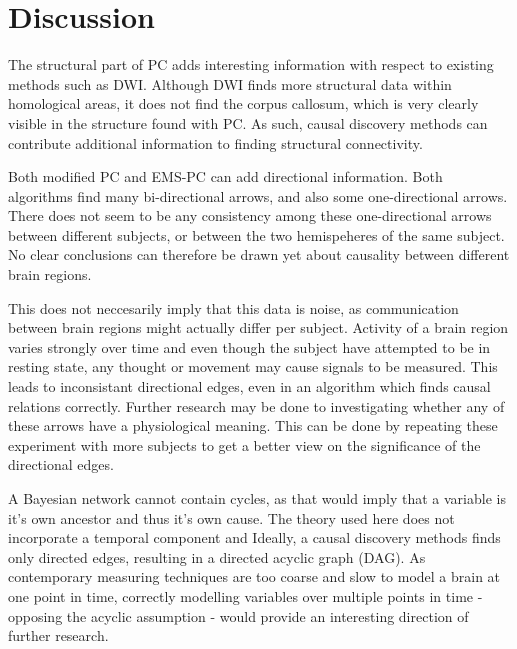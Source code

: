 \documentclass[a4paper, 10pt, english, onecolumn]{article}
\begin{document}
\section{Discussion}

The structural part of PC adds interesting information with respect to existing methods such as DWI.
Although DWI finds more structural data within homological areas, it does not find the corpus callosum, which is very clearly visible in the structure found with PC.
As such, causal discovery methods can contribute additional information to finding structural connectivity.

Both modified PC and EMS-PC can add directional information.
Both algorithms find many bi-directional arrows, and also some one-directional arrows.
There does not seem to be any consistency among these one-directional arrows  between different subjects, or between the two hemispeheres of the same subject.
No clear conclusions can therefore be drawn yet about causality between different brain regions.

This does not neccesarily imply that this data is noise, as communication between brain regions might actually differ per subject.
Activity of a brain region varies strongly over time and even though the subject have attempted to be in resting state, any thought or movement may cause signals to be measured.
This leads to inconsistant directional edges, even in an algorithm which finds causal relations correctly.
Further research may be done to investigating whether any of these arrows have a physiological meaning.
This can be done by repeating these experiment with more subjects to get a better view on the significance of the directional edges.

A Bayesian network cannot contain cycles, as that would imply that a variable is it's own ancestor and thus it's own cause.
The theory used here does not incorporate a temporal component and 
Ideally, a causal discovery methods finds only directed edges, resulting in a directed acyclic graph (DAG).
As contemporary measuring techniques are too coarse and slow to model a brain at one point in time, correctly modelling variables over multiple points in time - opposing the acyclic assumption - would provide an interesting direction of further research.
\end{document}
